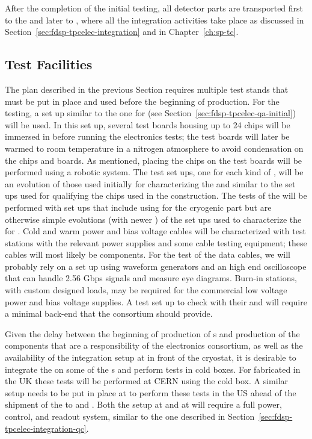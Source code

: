 After the completion of the initial  testing, all detector 
parts are transported first to the  and later to , 
where all the integration activities take place as discussed in
Section~\ref{sec:fdsp-tpcelec-integration} and in Chapter~\ref{ch:sp-tc}.

\subsection{Test Facilities}
\label{sec:fdsp-tpcelec-production-facilities}

The  plan described in the previous Section requires
multiple test stands that must be put in place and used 
before the beginning of production. For the 
testing, a set up similar to the one for  (see
Section~\ref{sec:fdsp-tpcelec-qa-initial}) will
be used. In this set up, several test boards housing up to 24
chips will be immersed in \lntwo before running the
electronics tests; the test boards will later be warmed to room temperature in 
a nitrogen atmosphere to avoid condensation on the chips and
boards. As mentioned, placing the chips on the test 
boards will be performed using a robotic system. The test set ups,
one for each kind of , will be an evolution of those
used initially for characterizing the  and similar
to the set ups used for qualifying the chips used in the 
construction. The tests of the  will be performed with
set ups that include using  for the cryogenic part
but are otherwise simple evolutions (with newer )
of the set ups used to characterize the 
for . Cold and warm power and bias voltage cables will
be characterized with test stations with the relevant 
power supplies and some cable testing equipment; these cables will most
likely be  components.
For the test of the data cables, we will probably rely on a set up
using waveform generators and an high end oscilloscope that 
can handle 2.56 Gbps signals and measure eye diagrams. 
Burn-in stations, with custom designed loads, may be required for 
the commercial low voltage power and bias voltage supplies.
A test set up to check  with their 
and  will require a minimal  back-end that the
 consortium should provide.

Given the delay between the beginning of production of 
s and production of the components that are a responsibility of
the  electronics consortium, as well as the availability of the
integration setup at  in front of the cryostat, it is
desirable to integrate the  on some of the s 
and perform tests in cold boxes. For  fabricated in the UK
these tests will be performed at CERN using the  cold box.
A similar setup needs to be put in place at  to perform 
these tests in the US ahead of the shipment of the  to 
 and . Both the setup at  and
at  will require a full power, control, and readout system, similar
to the one described in Section~\ref{sec:fdsp-tpcelec-integration-qc}.
